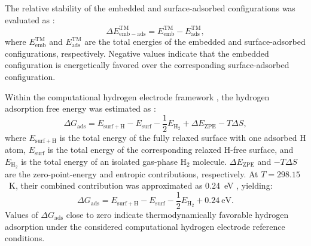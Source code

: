 \documentclass[journal=jacsat,manuscript=article]{achemso}
\begin{document}
The relative stability of the embedded and surface-adsorbed configurations was evaluated as \cite{Liao2022,Sholl2009DensityTheory,Martin2004ElectronicMethods}:
\begin{equation}
    \Delta E_{\mathrm{emb-ads}}^{\mathrm{TM}}
    =
    E_{\mathrm{emb}}^{\mathrm{TM}}
    -
    E_{\mathrm{ads}}^{\mathrm{TM}},
    \label{eq:relative_stability}
\end{equation}
where $E_{\mathrm{emb}}^{\mathrm{TM}}$ and $E_{\mathrm{ads}}^{\mathrm{TM}}$ are the total energies of the embedded and surface-adsorbed configurations, respectively. Negative values indicate that the embedded configuration is energetically favored over the corresponding surface-adsorbed configuration.

Within the computational hydrogen electrode framework \cite{NORSKOV2004}, the hydrogen adsorption free energy was estimated as \cite{Liao2022,Sholl2009DensityTheory,Martin2004ElectronicMethods}:
\begin{equation}
    \Delta G_{\mathrm{ads}}
    =
    E_{\mathrm{surf+H}}
    -
    E_{\mathrm{surf}}
    -
    \frac{1}{2}E_{\mathrm{H_2}}
    +
    \Delta E_{\mathrm{ZPE}}
    -
    T\Delta S,
    \label{eq:Gads}
\end{equation}
where $E_{\mathrm{surf+H}}$ is the total energy of the fully relaxed surface with one adsorbed H atom, $E_{\mathrm{surf}}$ is the total energy of the corresponding relaxed H-free surface, and $E_{\mathrm{H_2}}$ is the total energy of an isolated gas-phase H$_2$ molecule. $\Delta E_{\mathrm{ZPE}}$ and $-T\Delta S$ are the zero-point-energy and entropic contributions, respectively. At $T=298.15$~K, their combined contribution was approximated as 0.24~eV \cite{Norskov_2005}, yielding:
\begin{equation}
    \Delta G_{\mathrm{ads}}
    =
    E_{\mathrm{surf+H}}
    -
    E_{\mathrm{surf}}
    -
    \frac{1}{2}E_{\mathrm{H_2}}
    +
    0.24~\mathrm{eV}.
    \label{eq:Gads_approx}
\end{equation}
Values of $\Delta G_{\mathrm{ads}}$ close to zero indicate thermodynamically favorable hydrogen adsorption under the considered computational hydrogen electrode reference conditions.
\end{document}
